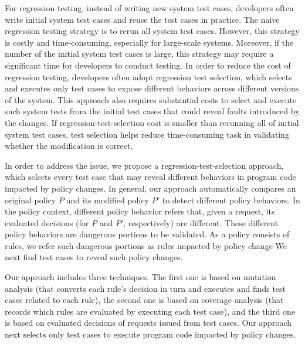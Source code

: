 For regression testing, instead of writing new system test cases, developers often write initial system test cases and 
reuse the test cases in practice. The naive regression testing strategy is to rerun all system test cases. However,
 this strategy is costly and time-consuming, especially for large-scale systems. Moreover, if the number of the initial 
system test cases is large, this strategy may require a significant time for developers to conduct testing. In order to
 reduce the cost of regression testing, developers often adopt regression test selection, which selects and executes only
 test cases to expose different behaviors across different versions of the system. This approach also requires substantial
 costs to select and execute such system tests from the initial test cases that could reveal faults introduced by the changes. 
If regression-test-selection cost is smaller than rerunning all of initial system test cases, test selection helps reduce 
time-consuming task in validating whether the modification is correct. 

In order to address the issue, we propose a regression-test-selection approach, which selects every test case that may 
reveal different behaviors in program code impacted by policy changes.
In general, our approach automatically compares an original 
policy $P$ and its modified policy $P'$ to detect different policy behaviors. In the policy context, different policy 
behavior refers that, given a request, its evaluated decisions (for $P$  and  $P'$, respectively) are different.
These different policy behaviors are dangerous portions to be validated.
As a policy consists of rules, we refer such dangerous portions as rules impacted by policy change
We next find test cases to reveal such policy changes.



Our approach includes three techniques.
The first one is based on mutation analysis (that converts each rule's decision in turn and executes 
and finds test cases related to each rule), the second one is based on coverage analysis (that records 
which rules are evaluated by executing each test case), and the third one is based on evaluated 
decisions of requests issued from test cases. Our approach next selects only test cases to execute program code impacted by policy changes.

